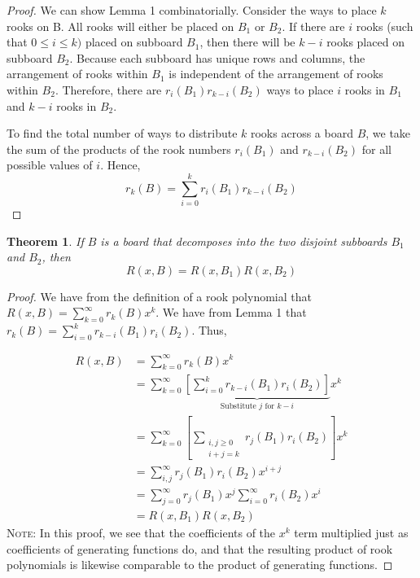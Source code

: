 \documentclass{article}
\newtheorem{theorem}{Theorem}
\begin{document}
\begin{proof}
   We can show Lemma 1 combinatorially. Consider the ways to place $k$ rooks on B. All rooks will either be placed on $B_1$ or $B_2$. If there are $i$ rooks (such that $0 \leq i \leq k)$ placed on subboard $B_1$, then there will be $k-i$ rooks placed on subboard $B_2$. Because each subboard has unique rows and columns, the arrangement of rooks within $B_1$ is independent of the arrangement of rooks within $B_2$. Therefore, there are $r_i(B_1) r_{k-i}(B_2)$ ways to place $i$ rooks in $B_1$ and $k-i$ rooks in $B_2$. 
    
    To find the total number of ways to distribute $k$ rooks across a board $B$, we take the sum of the products of the rook numbers $r_i(B_1)$ and $r_{k-i}(B_2)$ for all possible values of $i$. Hence, 
    $$r_k(B) = \sum_{i=0}^{k}r_{i}(B_1)r_{k-i}(B_2)$$
\end{proof}

\begin{theorem}
    If $B$ is a board that decomposes into the two disjoint subboards $B_1$ and $B_2$, then
    \begin{equation} \label{thm1}
        R(x,B) = R(x,B_1)R(x,B_2)
    \end{equation}
\end{theorem}

\begin{proof}
    We have from the definition of a rook polynomial that $R(x,B) = \sum_{k=0}^{\infty} r_k(B) x^k$. We have from Lemma 1 that $r_k(B) = \sum_{i=0}^{k}r_{k-i}(B_1)r_i(B_2)$. Thus,
    
    \begin{align*}
        R(x,B) &= \sum_{k=0}^{\infty} r_k(B) x^k \\
        &= \sum_{k=0}^{\infty} \underbrace{\left[ \sum_{i=0}^{k}r_{k-i}(B_1)r_i(B_2) \right]}_{\text{Substitute $j$ for $k-i$}} x^k \\
        &= \sum_{k=0}^{\infty} \left[ \sum_{\substack{i,j \geq 0 \\ i+j=k}}r_{j}(B_1)r_i(B_2) \right] x^k \\
        &= \sum_{i,j}^{\infty} r_j(B_1) r_i(B_2) x^{i+j} \\
        &= \sum_{j=0}^{\infty} r_j(B_1) x^j \sum_{i=0}^{\infty} r_i(B_2) x^i \\
        &= R(x,B_1)R(x,B_2)
    \end{align*}
    \textsc{Note:} In this proof, we see that the coefficients of the $x^k$ term multiplied just as coefficients of generating functions do, and that the resulting product of rook polynomials is likewise comparable to the product of generating functions.
\end{proof}
\end{document}
